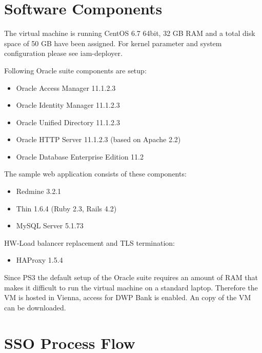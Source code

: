 \documentclass[11pt]{report}
\begin{document}
\section{Software Components}

The virtual machine is running CentOS 6.7 64bit, 32 GB RAM and a total
disk space of 50 GB have been assigned.  For kernel parameter and system
configuration please see iam-deployer.

Following Oracle suite components are setup:

\begin{itemize}

    \item Oracle Access Manager 11.1.2.3
    \item Oracle Identity Manager 11.1.2.3
    \item Oracle Unified Directory 11.1.2.3
    \item Oracle HTTP Server 11.1.2.3 (based on Apache 2.2) 
    \item Oracle Database Enterprise Edition 11.2

\end{itemize}

The sample web application consists of these components:

\begin{itemize}

    \item Redmine 3.2.1
    \item Thin 1.6.4 (Ruby 2.3, Rails 4.2)
    \item MySQL Server 5.1.73

\end{itemize}

HW-Load balancer replacement and TLS termination:

\begin{itemize}

    \item HAProxy 1.5.4

\end{itemize}


Since PS3 the default setup of the Oracle suite requires an amount of RAM that
makes it difficult to run the virtual machine on a standard laptop.  Therefore
the VM is hosted in Vienna, access for DWP Bank is enabled.  An copy of the VM
can be downloaded.



\section{SSO Process Flow}
\end{document}
